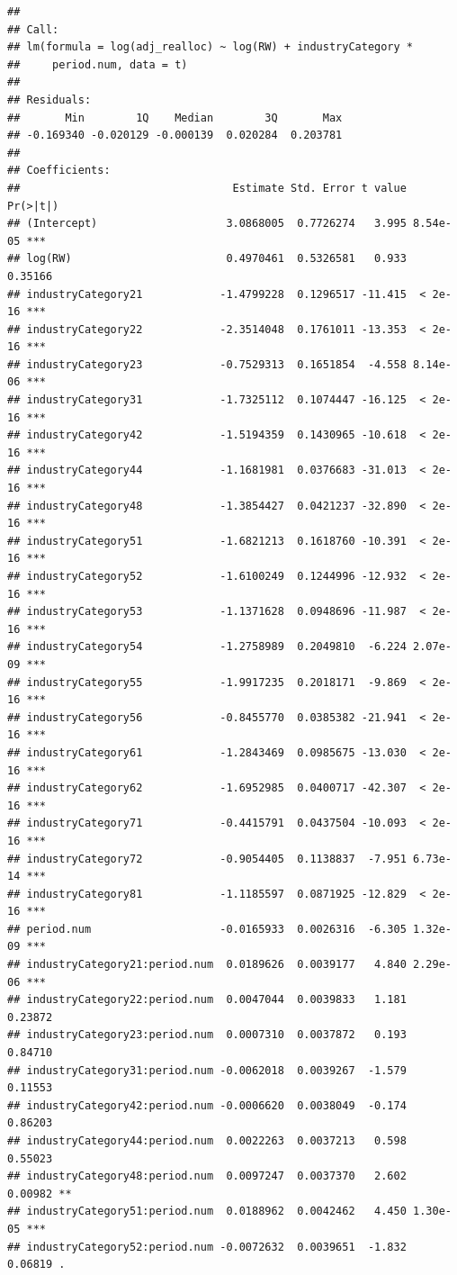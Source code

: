 \documentclass[
]{article}
\begin{document}
\begin{verbatim}
## 
## Call:
## lm(formula = log(adj_realloc) ~ log(RW) + industryCategory * 
##     period.num, data = t)
## 
## Residuals:
##       Min        1Q    Median        3Q       Max 
## -0.169340 -0.020129 -0.000139  0.020284  0.203781 
## 
## Coefficients:
##                                 Estimate Std. Error t value Pr(>|t|)    
## (Intercept)                    3.0868005  0.7726274   3.995 8.54e-05 ***
## log(RW)                        0.4970461  0.5326581   0.933  0.35166    
## industryCategory21            -1.4799228  0.1296517 -11.415  < 2e-16 ***
## industryCategory22            -2.3514048  0.1761011 -13.353  < 2e-16 ***
## industryCategory23            -0.7529313  0.1651854  -4.558 8.14e-06 ***
## industryCategory31            -1.7325112  0.1074447 -16.125  < 2e-16 ***
## industryCategory42            -1.5194359  0.1430965 -10.618  < 2e-16 ***
## industryCategory44            -1.1681981  0.0376683 -31.013  < 2e-16 ***
## industryCategory48            -1.3854427  0.0421237 -32.890  < 2e-16 ***
## industryCategory51            -1.6821213  0.1618760 -10.391  < 2e-16 ***
## industryCategory52            -1.6100249  0.1244996 -12.932  < 2e-16 ***
## industryCategory53            -1.1371628  0.0948696 -11.987  < 2e-16 ***
## industryCategory54            -1.2758989  0.2049810  -6.224 2.07e-09 ***
## industryCategory55            -1.9917235  0.2018171  -9.869  < 2e-16 ***
## industryCategory56            -0.8455770  0.0385382 -21.941  < 2e-16 ***
## industryCategory61            -1.2843469  0.0985675 -13.030  < 2e-16 ***
## industryCategory62            -1.6952985  0.0400717 -42.307  < 2e-16 ***
## industryCategory71            -0.4415791  0.0437504 -10.093  < 2e-16 ***
## industryCategory72            -0.9054405  0.1138837  -7.951 6.73e-14 ***
## industryCategory81            -1.1185597  0.0871925 -12.829  < 2e-16 ***
## period.num                    -0.0165933  0.0026316  -6.305 1.32e-09 ***
## industryCategory21:period.num  0.0189626  0.0039177   4.840 2.29e-06 ***
## industryCategory22:period.num  0.0047044  0.0039833   1.181  0.23872    
## industryCategory23:period.num  0.0007310  0.0037872   0.193  0.84710    
## industryCategory31:period.num -0.0062018  0.0039267  -1.579  0.11553    
## industryCategory42:period.num -0.0006620  0.0038049  -0.174  0.86203    
## industryCategory44:period.num  0.0022263  0.0037213   0.598  0.55023    
## industryCategory48:period.num  0.0097247  0.0037370   2.602  0.00982 ** 
## industryCategory51:period.num  0.0188962  0.0042462   4.450 1.30e-05 ***
## industryCategory52:period.num -0.0072632  0.0039651  -1.832  0.06819 .  

\end{verbatim}
\end{document}
